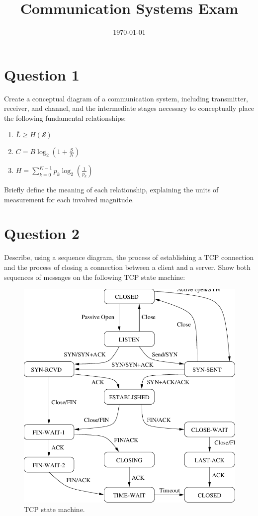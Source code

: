 \documentclass[12pt]{article}
\title{Communication Systems Exam}
\author{}
\date{\today}
\begin{document}
	
	\maketitle
	
	\section{Question 1}
	
	Create a conceptual diagram of a communication system, including transmitter, receiver, and channel, and the intermediate stages necessary to conceptually place the following fundamental relationships:
	
	\begin{enumerate}
		\item $\overline{L} \geq H(\mathcal{S})$
		\item $C = B\log_2\left(1+ \frac{S}{N}\right)$
		\item $H = \sum_{k = 0}^{K - 1} p_k \log_2\left(\frac{1}{p_k}\right)$
	\end{enumerate}
	
	Briefly define the meaning of each relationship, explaining the units of measurement for each involved magnitude.
	
	\vspace{10cm}
	
	\section{Question 2}
	
	Describe, using a sequence diagram, the process of establishing a TCP connection and the process of closing a connection between a client and a server. Show both sequences of messages on the following TCP state machine:
	
	\begin{figure}[ht]
		\centering
		\includegraphics[scale=0.5]{tcp.jpg}
		\caption{TCP state machine.}
		\label{fig:tcp}
	\end{figure}
	
\end{document}
